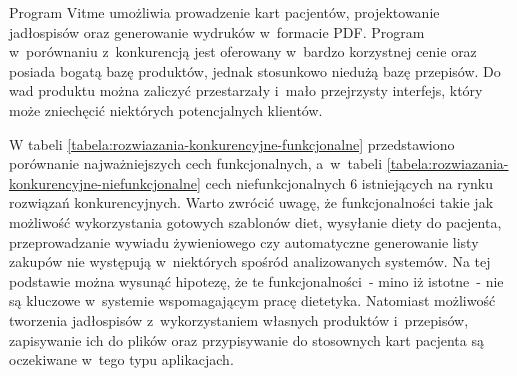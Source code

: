 \begin{itemize}
        Program Vitme\cite{url:vitme} umożliwia prowadzenie kart pacjentów, projektowanie jadłospisów oraz generowanie wydruków w~formacie PDF.
        Program w~porównaniu z~konkurencją jest oferowany w~bardzo korzystnej cenie oraz posiada bogatą bazę produktów, jednak stosunkowo niedużą bazę przepisów.
        Do wad produktu można zaliczyć przestarzały i~mało przejrzysty interfejs, który może zniechęcić niektórych potencjalnych klientów.
%
\end{itemize}

W tabeli \ref{tabela:rozwiazania-konkurencyjne-funkcjonalne} przedstawiono porównanie najważniejszych cech funkcjonalnych,
a~w~tabeli \ref{tabela:rozwiazania-konkurencyjne-niefunkcjonalne} cech niefunkcjonalnych
6 istniejących na rynku rozwiązań konkurencyjnych\cite{url:porownanie-programow-dietetycznych}.
Warto zwrócić uwagę, że funkcjonalności takie jak możliwość wykorzystania gotowych szablonów diet, wysyłanie diety do pacjenta,
przeprowadzanie wywiadu żywieniowego czy automatyczne generowanie listy zakupów nie występują w~niektórych spośród analizowanych systemów.
Na tej podstawie można wysunąć hipotezę, że te funkcjonalności~- mino iż istotne~- nie są kluczowe w~systemie wspomagającym pracę dietetyka.
Natomiast możliwość tworzenia jadłospisów z~wykorzystaniem własnych produktów i~przepisów,
zapisywanie ich do plików oraz przypisywanie do stosownych kart pacjenta są oczekiwane w~tego typu aplikacjach.

